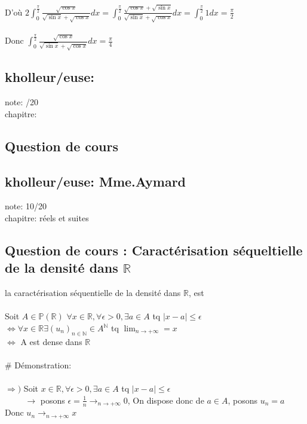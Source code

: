 \documentclass{article}
\begin{document}
D'où $2\int_0^{\frac{\pi}{2}} \frac{\sqrt{\cos x}}{\sqrt{\sin x} + \sqrt{\cos x}} dx = \int_0^{\frac{\pi}{2}} \frac{\sqrt{\cos x} + \sqrt{\sin x}}{\sqrt{\sin x} + \sqrt{\cos x}} dx = \int_0^{\frac{\pi}{2}} 1 dx = \frac{\pi}{2}$ \\ \\
Donc $\int_0^{\frac{\pi}{2}} \frac{\sqrt{\cos x}}{\sqrt{\sin x} + \sqrt{\cos x}} dx = \frac{\pi}{4}$ 

\subsection{kholleur/euse: }

note: /20 \\
chapitre: 

\subsection{Question de cours}


\subsection{kholleur/euse: Mme.Aymard}

note: 10/20 \\
chapitre: réels et suites

\subsection{Question de cours : Caractérisation séqueltielle de la densité dans $\mathbb{R}$}

la caractérisation séquentielle de la densité dans $\mathbb{R}$, est \\ \\
Soit $A \in \mathbb{P}(\mathbb{R})$
$\forall x \in \mathbb{R}, \forall \epsilon > 0, \exists a \in A$ tq $|x-a| \leqslant \epsilon$ \\
$\Leftrightarrow \forall x \in \mathbb{R}\exists \left(u_n \right)_{n \in \mathbb{N}} \in A^{\mathbb{N}}$ tq $\lim_{n \rightarrow +\infty} = x$ \\
$\Leftrightarrow$ A est dense dans $\mathbb{R}$ \\ \\

$\#$ Démonstration: \\ \\
$\Rightarrow )$ Soit $x \in \mathbb{R}, \forall \epsilon > 0, \exists a \in A$ tq $|x-a| \leqslant \epsilon$ \\
$\hspace{1cm} \rightarrow$ posons $\epsilon = \frac{1}{n} \rightarrow_{n \rightarrow +\infty} 0$, On dispose donc de $a \in A$, posons $u_n = a$ \\
Donc $u_n \rightarrow_{n \rightarrow +\infty} x$ \\ \\
\end{document}
